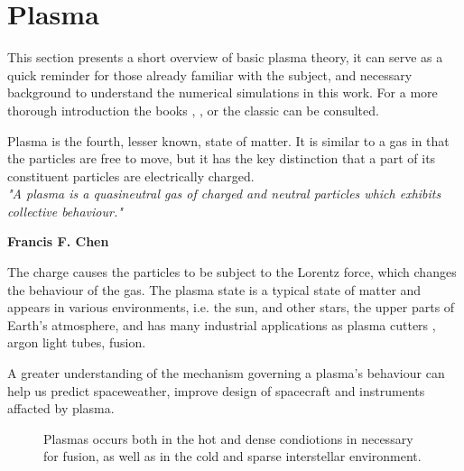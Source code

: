 \section{Plasma}
	\label{sec:plasma}
	This section presents a short overview of basic plasma theory, it can serve as a
	quick reminder for those already familiar with the subject, and necessary
	background to understand the numerical simulations in this work.
	For a more thorough introduction the books \textit{}
    \citep{fitzpatrick_plasma_2014}, \textit{} \citep{goldston_introduction_1995},
    \textit{} \citep{pecseli_waves_2012} or the classic
    \textit{} \citep{chen_introduction_1984} can be consulted.

	Plasma is the fourth, lesser known, state of matter. It is similar to a gas
	in that the particles are free to move, but it has the key distinction that
	a part of its constituent particles are electrically charged.
	\\[1.0cm]
	\indent \textit{\large"A plasma is a quasineutral gas of charged and neutral particles which exhibits
	collective behaviour."}
	\begin{flushright}
	    \textbf{Francis F. Chen}\\[1.0cm]
	\end{flushright}
	The charge causes the particles to be subject to the Lorentz force, which
	changes the behaviour of the gas. The plasma state is a typical state of matter
	and appears in various environments, i.e. the sun, and other stars, the upper parts of Earth's atmosphere,
 	and has many industrial applications as plasma cutters , argon light tubes, fusion.

	A greater understanding of the mechanism governing a plasma's behaviour can help
	us predict spaceweather, improve design of spacecraft and instruments affacted by plasma.


	\begin{figure}
		\begin{center}
		\end{center}
		\caption{Plasmas occurs both in the hot and dense condiotions in necessary for fusion, as
		well as in the cold and sparse interstellar environment.
		}
	\end{figure}



